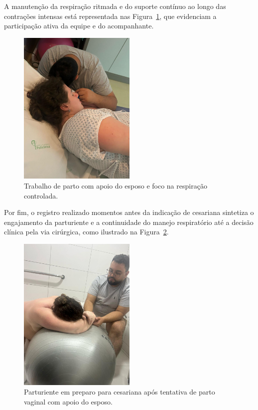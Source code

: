 \documentclass[openright]{tex/estilos/normas-utf-tex}
\begin{document}
A manutenção da respiração ritmada e do suporte contínuo ao longo das contrações intensas está representada nas Figura~\ref{fig:trabalho-parto-companheiro}, que evidenciam a participação ativa da equipe e do acompanhante.

\begin{figure}[H]
    \centering
    \includegraphics[width=0.5\textwidth]{assets/imagens/IMG_0761.JPG}
    \caption{Trabalho de parto com apoio do esposo e foco na respiração controlada.}
    \label{fig:trabalho-parto-companheiro}
\end{figure}

Por fim, o registro realizado momentos antes da indicação de cesariana sintetiza o engajamento da parturiente e a continuidade do manejo respiratório até a decisão clínica pela via cirúrgica, como ilustrado na Figura~\ref{fig:antes-cesaria}.

\begin{figure}[H]
    \centering
    \includegraphics[width=0.5\textwidth]{assets/imagens/IMG_0762.JPG}
    \caption{Parturiente em preparo para cesariana após tentativa de parto vaginal com apoio do esposo.}
    \label{fig:antes-cesaria}
\end{figure}
\end{document}

